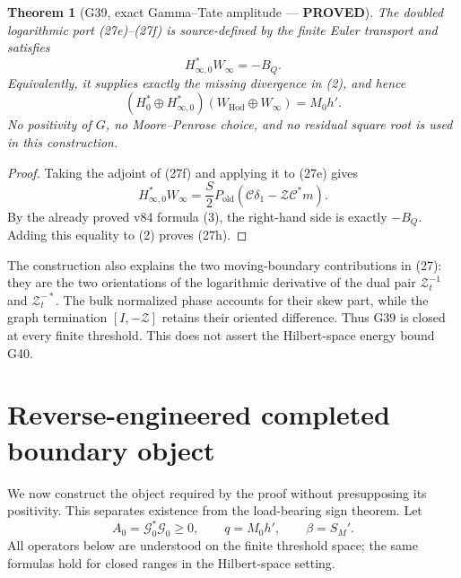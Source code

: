\documentclass[11pt]{article}
\newtheorem{theorem}{Theorem}
\newcommand{\PROVED}{\textcolor{green!45!black}{\textbf{PROVED}}}
\newcommand{\old}{\mathrm{old}}
\newcommand{\Hod}{\mathrm{Hod}}
\newcommand{\cC}{\mathscr C}
\newcommand{\cZ}{\mathscr Z}
\begin{document}
\begin{theorem}[G39, exact Gamma--Tate amplitude --- \PROVED]
The doubled logarithmic port (27e)--(27f) is source-defined by the finite
Euler transport and satisfies
\begin{equation}
 \boxed{H_{\infty,0}^*W_\infty=-B_Q}.                   \tag{27g}
\end{equation}
Equivalently, it supplies exactly the missing divergence in (2), and hence
\begin{equation}
 (H_0^*\oplus H_{\infty,0}^*)
 (W_{\Hod}\oplus W_\infty)=M_0h'.                       \tag{27h}
\end{equation}
No positivity of $G$, no Moore--Penrose choice, and no residual square root is
used in this construction.
\end{theorem}

\begin{proof}
Taking the adjoint of (27f) and applying it to (27e) gives
\[
 H_{\infty,0}^*W_\infty
 =\frac S2P_{\old}
 \left(\cC\delta_1-\cZ\cC^*m\right).
\]
By the already proved v84 formula (3), the right-hand side is exactly $-B_Q$.
Adding this equality to (2) proves (27h).
\end{proof}

The construction also explains the two moving-boundary contributions in
(27): they are the two orientations of the logarithmic derivative of the
dual pair $\cZ_t^{-1}$ and $\cZ_t^{-*}$.  The bulk normalized phase accounts
for their skew part, while the graph termination $[I,-\cZ]$ retains their
oriented difference.  Thus G39 is closed at every finite threshold.  This
does not assert the Hilbert-space energy bound G40.

\section{Reverse-engineered completed boundary object}

We now construct the object required by the proof without presupposing its
positivity.  This separates existence from the load-bearing sign theorem.
Let
\[
 A_0=\mathcal G_0^*\mathcal G_0\ge0,
 \qquad q=M_0h',\qquad \beta=S_M'.
\]
All operators below are understood on the finite threshold space; the same
formulas hold for closed ranges in the Hilbert-space setting.
\end{document}
